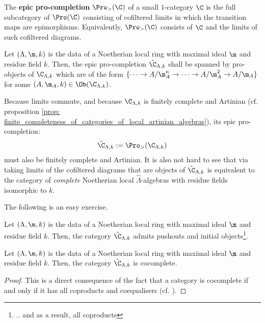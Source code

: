        \begin{definition} \label{def: epic_pro_objects}
            The \textbf{epic pro-completion} $\Pro
            _>(\C)$ of a small $1$-category $\C$ is the full subcategory of $\Pro(\C)$ consisting of cofiltered limits in which the transition maps are epimorphisms. Equivalently, $\Pro
            _>(\C)$ consists of $\C$ and the limits of such cofiltered diagrams.  
        \end{definition}
        \begin{example} \label{example: completed_artinian_local_algebras}
            Let $(\Lambda, \m, k)$ is the data of a Noetherian local ring with maximal ideal $\m$ and residue field $k$. Then, the epic pro-completion $\hat{\C}_{\Lambda, k}$ shall be spanned by pro-objects of $\C_{\Lambda, k}$ which are of the form $\{\cdots \to A/\m_A^n \to \cdots \to A/\m_A^2 \to A/\m_A\}$ for some $(A, \m_A, k) \in \Ob(\C_{\Lambda, k})$. 
            
            Because limits commute, and because $\C_{\Lambda, k}$ is finitely complete and Artinian (cf. proposition \ref{prop: finite_completeness_of_categories_of_local_artinian_algebras}), its epic pro-completion:
                $$\hat{\C}_{\Lambda, k} := \Pro_>(\C_{\Lambda, k})$$
            must also be finitely complete and Artinian. It is also not hard to see that via taking limits of the cofiltered diagrams that are objects of $\hat{\C}_{\Lambda, k}$ is equivalent to the category of \textit{complete} Noetherian local $\hat{\Lambda}$-algebras with residue fields isomorphic to $k$.
        \end{example}
        The following is an easy exercise. 
        \begin{proposition} \label{prop: pushouts_and_coproducts_of_completed_artinian_local_algebras}
            Let $(\Lambda, \m, k)$ is the data of a Noetherian local ring with maximal ideal $\m$ and residue field $k$. Then, the category $\hat{\C}_{\Lambda, k}$ admits pushouts and initial objects\footnote{.. and as a result, all coproducts}.
        \end{proposition}
        \begin{corollary}
            Let $(\Lambda, \m, k)$ is the data of a Noetherian local ring with maximal ideal $\m$ and residue field $k$. Then, the category $\hat{\C}_{\Lambda, k}$ is cocomplete.
        \end{corollary}
            \begin{proof}
                This is a direct consequence of the fact that a category is cocomplete if and only if it has all coproducts and coequalisers (cf. \cite[Theorem V.2.1]{maclane}).
            \end{proof}
            
